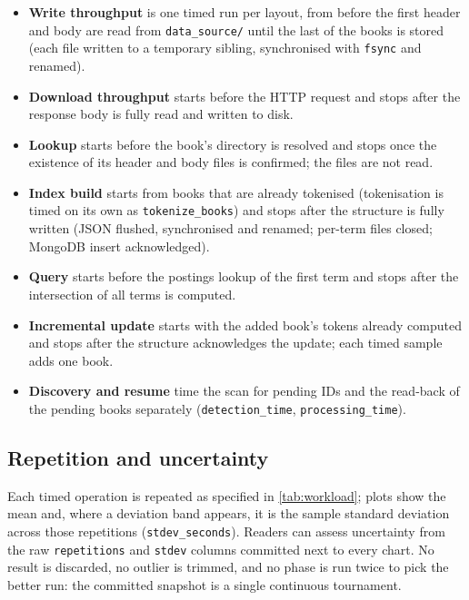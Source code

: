 \begin{itemize}
    \item \textbf{Write throughput} is one timed run per layout, from before
    the first header and body are read from \texttt{data\_source/} until the
    last of the  books is stored (each file written to a temporary
    sibling, synchronised with \texttt{fsync} and renamed).
    \item \textbf{Download throughput} starts before the HTTP request and
    stops after the response body is fully read and written to disk.
    \item \textbf{Lookup} starts before the book's directory is resolved and
    stops once the existence of its header and body files is confirmed; the
    files are not read.
    \item \textbf{Index build} starts from books that are already tokenised
    (tokenisation is timed on its own as \texttt{tokenize\_books}) and stops
    after the structure is fully written (JSON flushed, synchronised and
    renamed; per-term files closed; MongoDB insert acknowledged).
    \item \textbf{Query} starts before the postings lookup of the first term
    and stops after the intersection of all terms is computed.
    \item \textbf{Incremental update} starts with the added book's tokens
    already computed and stops after the structure acknowledges the update;
    each timed sample adds one book.
    \item \textbf{Discovery and resume} time the scan for pending IDs and the
    read-back of the pending books separately (\texttt{detection\_time},
    \texttt{processing\_time}).
\end{itemize}

\subsection{Repetition and uncertainty}
\label{sec:uncertainty}

Each timed operation is repeated as specified in \cref{tab:workload}; plots
show the mean and, where a deviation band appears, it is the sample standard
deviation across those repetitions (\texttt{stdev\_seconds}). Readers can
assess uncertainty from the raw \texttt{repetitions} and \texttt{stdev}
columns committed next to every chart. No result is discarded, no outlier is
trimmed, and no phase is run twice to pick the better run: the committed
snapshot is a single continuous tournament.

